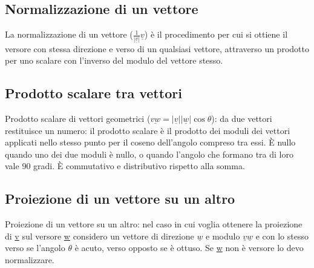 \subsection{Normalizzazione di un vettore}
La normalizzazione di un vettore ($\frac{1}{|\underline{v}|}\underline{v}$) \`e il procedimento per cui si ottiene il versore con stessa direzione e verso di un qualsiasi 
vettore, attraverso un prodotto per uno scalare con l'inverso del modulo del vettore stesso. 
\subsection{Prodotto scalare tra vettori}
Prodotto scalare di vettori geometrici ($\underline{vw}=|\underline{v}||\underline{w}|\cos\theta$): da due vettori restituisce un numero: il prodotto scalare \`e il prodotto 
dei moduli dei vettori applicati nello stesso punto per il coseno dell'angolo compreso tra essi. \`E nullo quando uno dei due moduli \`e nullo, o quando l'angolo che formano 
tra di loro vale 90 gradi. \`E commutativo e distributivo
rispetto alla somma.
\subsection{Proiezione di un vettore su un altro}
Proiezione di un vettore su un altro: nel caso in cui voglia ottenere la proiezione di \underline{v} sul versore \underline{w} considero un vettore di direzione $\underline{w}
$ e modulo $\underline{v}\underline{w}$ e con lo stesso verso se l'angolo $\theta$ \`e acuto, verso opposto se \`e ottuso. Se \underline{w} non \`e versore lo devo 
normalizzare.